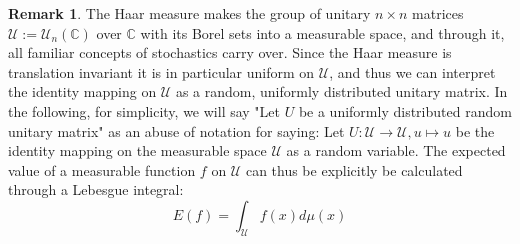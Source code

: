 \documentclass[12pt,a4paper,BCOR15mm,twoside,DIV12]{article}
\def\C{\mathbb{C}}
\def\U{\mathcal{U}}
\theoremstyle{definition}
\newtheorem{rem}[Satz]{Remark}
\begin{document}
\begin{rem}\label{remrandommatrix}
The Haar measure makes the group of unitary $n \times n$ matrices $\U:=\U_n(\C)$ over $\C$ with its Borel sets into a measurable space, and through it, all familiar concepts of stochastics carry over.
Since the Haar measure is translation invariant it is in particular uniform on $\U$, and thus we can interpret the identity mapping on $\U$ as a random, uniformly distributed unitary matrix.
In the following, for simplicity, we will say "Let $U$ be a uniformly distributed random unitary matrix" as an abuse of notation for saying: Let $U: \U \rightarrow \U, u \mapsto u$ be the identity mapping on the measurable space $\U$ as a random variable.
The expected value of a measurable function $f$ on $\U$ can thus be explicitly be calculated through a Lebesgue integral: 
\begin{equation}
E(f) = \int_{\U} f(x) d\mu(x)
\end{equation}
\end{rem}
\end{document}

